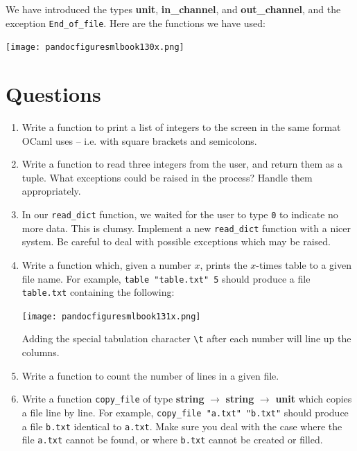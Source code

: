 \documentclass[]{book}
\begin{document}
We have introduced the types \textsf{\textbf{unit}}, \textsf{\textbf{in\_channel}}, and \textsf{\textbf{out\_channel}}, and the exception \texttt{End\_of\_file}. Here are the functions we have used:

\medskip
\begin{center}
\noindent\texttt{[image: pandocfiguresmlbook130x.png]}
\end{center}
\medskip

\section*{Questions}

\begin{enumerate}
\item Write a function to print a list of integers to the screen in the same format OCaml uses -- i.e. with square brackets and semicolons. 
\item Write a function to read three integers from the user, and return them as a tuple. What exceptions could be raised in the process? Handle them appropriately.
\item In our \texttt{read\_dict} function, we waited for the user to type \texttt{0} to indicate no more data. This is clumsy. Implement a new \texttt{read\_dict} function with a nicer system. Be careful to deal with possible exceptions which may be raised.
\item Write a function which, given a number $x$, prints the $x$-times table to a given file name. For example, \texttt{table "table.txt" 5} should produce a file \texttt{table.txt} containing the following:

\medskip
\begin{center}
\noindent\texttt{[image: pandocfiguresmlbook131x.png]}
\end{center}
\medskip


\noindent Adding the special tabulation character \verb!\t! after each number will line up the columns.

\item Write a function to count the number of lines in a given file.
\item Write a function \texttt{copy\_file} of type \textsf{\textbf{string} $\rightarrow$ \textbf{string} $\rightarrow$ \textbf{unit}} which copies a file line by line. For example, \texttt{copy\_file "a.txt" "b.txt"} should produce a file \texttt{b.txt} identical to \texttt{a.txt}. Make sure you deal with the case where the file \texttt{a.txt} cannot be found, or where \texttt{b.txt} cannot be created or filled. 
\end{enumerate}
\end{document}
